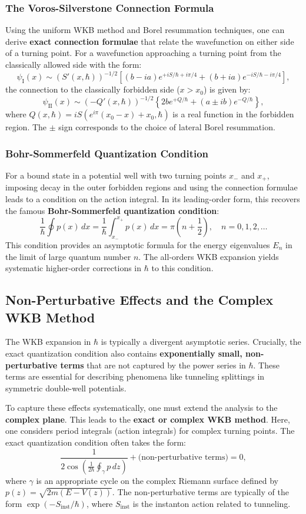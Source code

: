 \subsubsection{The Voros-Silverstone Connection Formula}
Using the uniform WKB method and Borel resummation techniques, one can derive \textbf{exact connection formulae} that relate the wavefunction on either side of a turning point. For a wavefunction approaching a turning point from the classically allowed side with the form:
\[
\psi_{\text{I}}(x) \sim \left(S'(x,\hbar)\right)^{-1/2} \left[ (b-ia)e^{+iS/\hbar + i\pi/4} + (b+ia)e^{-iS/\hbar - i\pi/4} \right],
\]
the connection to the classically forbidden side ($x > x_0$) is given by:
\[
\psi_{\text{II}}(x) \sim \left(-Q'(x,\hbar)\right)^{-1/2} \left\{ 2b e^{+Q/\hbar} + (a \pm i b) e^{-Q/\hbar} \right\},
\]
where $Q(x,\hbar) = iS(e^{i\pi}(x_0-x)+x_0, \hbar)$ is a real function in the forbidden region. The $\pm$ sign corresponds to the choice of lateral Borel resummation.

\subsubsection{Bohr-Sommerfeld Quantization Condition}
For a bound state in a potential well with two turning points $x_-$ and $x_+$, imposing decay in the outer forbidden regions and using the connection formulae leads to a condition on the action integral. In its leading-order form, this recovers the famous \textbf{Bohr-Sommerfeld quantization condition}:
\[
\frac{1}{\hbar} \oint p(x) \, dx = \frac{1}{\hbar} \int_{x_-}^{x_+} p(x) \, dx = \pi \left(n + \frac{1}{2}\right), \quad n = 0, 1, 2, \dots
\]
This condition provides an asymptotic formula for the energy eigenvalues $E_n$ in the limit of large quantum number $n$. The all-orders WKB expansion yields systematic higher-order corrections in $\hbar$ to this condition.

\subsection{Non-Perturbative Effects and the Complex WKB Method}
The WKB expansion in $\hbar$ is typically a divergent asymptotic series. Crucially, the exact quantization condition also contains \textbf{exponentially small, non-perturbative terms} that are not captured by the power series in $\hbar$. These terms are essential for describing phenomena like tunneling splittings in symmetric double-well potentials.

To capture these effects systematically, one must extend the analysis to the \textbf{complex plane}. This leads to the \textbf{exact or complex WKB method}. Here, one considers period integrals (action integrals) for complex turning points. The exact quantization condition often takes the form:
\[
\frac{1}{2\cos\left(\frac{1}{2\hbar}\oint_{\gamma} p\,dz\right)} + \text{(non-perturbative terms)} = 0,
\]
where $\gamma$ is an appropriate cycle on the complex Riemann surface defined by $p(z)=\sqrt{2m(E-V(z))}$. The non-perturbative terms are typically of the form $\exp(-S_{\text{inst}}/\hbar)$, where $S_{\text{inst}}$ is the instanton action related to tunneling.


